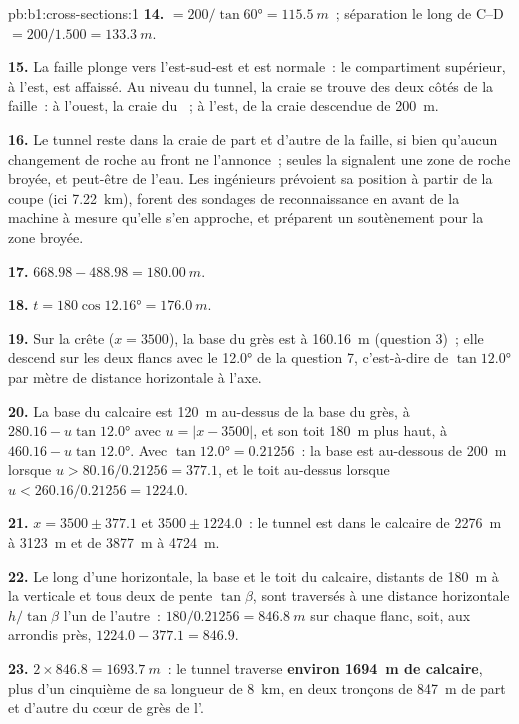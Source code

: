 \begin{solution}{pb:b1:cross-sections:1}
\textbf{14.}  $= 200/\tan\ang{60} = \qty{115.5}{m}$~; séparation
le long de C--D $= 200/1.500 = \qty{133.3}{m}$.

\textbf{15.} La faille plonge vers l'est-sud-est et est normale~: le compartiment
supérieur, à l'est, est affaissé. Au niveau du tunnel, la craie se trouve des
deux côtés de la faille~: à l'ouest, la craie du ~; à l'est, de la craie
descendue de \qty{200}{m}.

\textbf{16.} Le tunnel reste dans la craie de part et d'autre de la faille, si
bien qu'aucun changement de roche au front ne l'annonce~; seules la signalent une
zone de roche broyée, et peut-être de l'eau. Les ingénieurs prévoient sa
position à partir de la coupe (ici \qty{7.22}{km}), forent des sondages de
reconnaissance en avant de la machine à mesure qu'elle s'en approche, et
préparent un soutènement pour la zone broyée.

\textbf{17.} $668.98 - 488.98 = \qty{180.00}{m}$.

\textbf{18.} $t = 180\cos\ang{12.16} = \qty{176.0}{m}$.

\textbf{19.} Sur la crête ($x = 3500$), la base du grès est à
\qty{160.16}{m} (question 3)~; elle descend sur les deux flancs avec le  \ang{12.0} de la question 7, c'est-à-dire de $\tan\ang{12.0}$ par mètre
de distance horizontale à l'axe.

\textbf{20.} La base du calcaire est \qty{120}{m} au-dessus de la base du grès, à
$280.16 - u\tan\ang{12.0}$ avec $u = |x - 3500|$, et son toit
\qty{180}{m} plus haut, à $460.16 - u\tan\ang{12.0}$. Avec $\tan\ang{12.0} =
0.21256$~: la base est au-dessous de \qty{200}{m} lorsque
$u > 80.16/0.21256 = 377.1$, et le toit au-dessus lorsque
$u < 260.16/0.21256 = 1224.0$.

\textbf{21.} $x = 3500 \pm 377.1$ et $3500 \pm 1224.0$~: le tunnel est dans le
calcaire de \qty{2276}{m} à \qty{3123}{m} et de \qty{3877}{m} à
\qty{4724}{m}.

\textbf{22.} Le long d'une horizontale, la base et le toit du calcaire, distants
de \qty{180}{m} à la verticale et tous deux de pente $\tan\beta$, sont traversés
à une distance horizontale $h/\tan\beta$ l'un de l'autre~:
$180/0.21256 = \qty{846.8}{m}$ sur chaque flanc, soit, aux arrondis près,
$1224.0 - 377.1 = 846.9$.

\textbf{23.} $2\times846.8 = \qty{1693.7}{m}$~: le tunnel traverse
\textbf{environ \qty[text-series-to-math=true]{1694}{m} de calcaire}, plus d'un
cinquième de sa longueur de \qty{8}{km}, en deux tronçons de \qty{847}{m} de part
et d'autre du cœur de grès de l'.
\end{solution}
